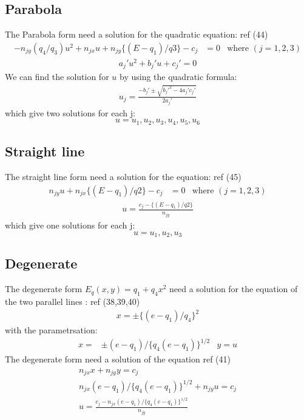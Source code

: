 \documentclass[11pt,a4paper]{article}
\begin{document}
\subsection{Parabola}
The Parabola form need a solution for the quadratic equation: ref (44)
\begin{align}
-n_{jy}(q_4 / q_3)u^2 + n_{jx}u + n_{jy} \{(E-q_1)/q3 \} - c_j &= 0  &\text{where  } (j = 1,2,3)
\end{align}
\begin{align}
a_j'u^2 + b_j'u + c_j' = 0
\end{align}
We can find the solution for $u$ by using the quadratic formula:
\begin{align}
u_j = \frac{-b_j ' \pm \sqrt{b_j '^2 - 4a_j'c_j'} }{2a_j'}
\end{align}
which give two solutions for each j:
\begin{equation}
u = u_1,u_2,u_3,u_4,u_5,u_6
\end{equation}

\subsection{Straight line}
The straight line form need a solution for the equation: ref (45)
\begin{align}
n_{jy}u + n_{jx} \{(E-q_1)/q2 \} - c_j &= 0  &\text{where  } (j = 1,2,3)
\end{align}
\begin{align}
u = \frac{ c_j - \{(E-q_1)/q2 \} }{n_{jy}}
\end{align}
which give one solutions for each j:
\begin{equation}
u = u_1,u_2,u_3
\end{equation}

\subsection{Degenerate}
The degenerate form $E_q (x,y)= q_1 + q_4 x^2 $ need a solution for the equation of the two parallel lines : ref (38,39,40)\\ 
\begin{align}
x = \pm \{ (e-q_1)/q_4 \}^2 
\end{align}
with the parametrsation: 
\begin{align}
x=& \pm (e-q_1)/ \{q_4(e-q_1) \}^{1/2} & y = u
\end{align}
The degenerate form need a solution of the equation ref (41) 
\begin{align}
n_{jx}x+n_{jy}y = c_j\\
n_{jx}(e-q_1)/ \{q_4(e-q_1) \}^{1/2} + n_{jy}u = c_j \\
u = \frac{c_j - n_{jx}(e-q_1)/ \{q_4(e-q_1) \}^{1/2} }{n_{jy}}
\end{align}
\end{document}
